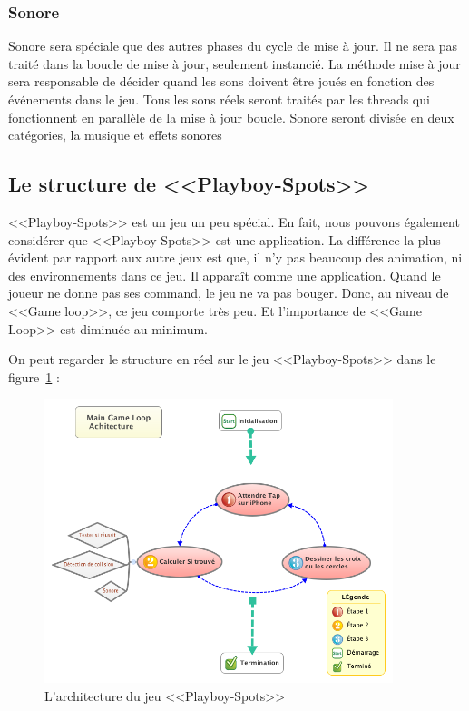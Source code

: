 
\subsubsection{Sonore} %
\label{ssub:sonore}

Sonore sera spéciale que des autres phases du cycle de mise à jour. Il ne sera pas traité dans la boucle de mise à jour, seulement instancié. La méthode mise à jour sera responsable de décider quand les sons doivent être joués en fonction des événements dans le jeu. Tous les sons réels seront traités par les threads qui fonctionnent en parallèle de la mise à jour boucle. Sonore seront divisée en deux catégories, la musique et effets sonores



\subsection{Le structure de <<Playboy-Spots>>} %
\label{sub:le_structure_de_playboy_spots_}

<<Playboy-Spots>> est un jeu un peu spécial. En fait, nous pouvons également considérer que <<Playboy-Spots>> est une application. La différence la plus évident par rapport aux autre jeux est que, il n'y pas beaucoup des animation, ni des environnements dans ce jeu. Il apparaît comme une application. Quand le joueur ne donne pas ses command, le jeu ne va pas bouger. Donc, au niveau de <<Game loop>>, ce jeu comporte très peu. Et l'importance de <<Game Loop>> est diminuée au minimum. 

On peut regarder le structure en réel sur le jeu <<Playboy-Spots>> dans le figure~\ref{fig:XMinds_AchitecturePlayboy} :
\begin{figure}[htbp]
	\centering
		\includegraphics[width=4in]{XMinds/AchitecturePlayboy.png}
	\caption{L'architecture du jeu <<Playboy-Spots>>}
	\label{fig:XMinds_AchitecturePlayboy}
\end{figure}
 


